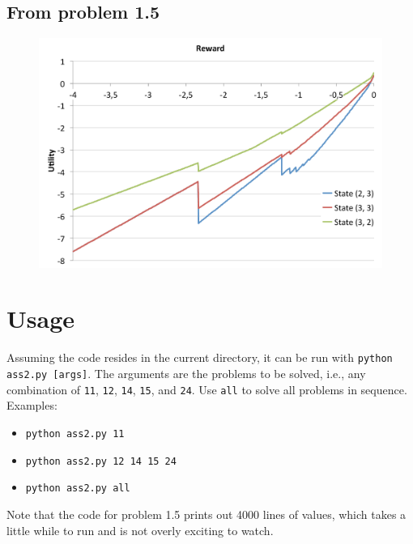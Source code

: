 \documentclass[letterpaper, 10pt]{article}
\begin{document}
\clearpage

\subsection{From problem 1.5}
\label{ssec:prob15fig}
\vfill
\begin{figure}[h]
	\centering
	\includegraphics[width=\textwidth]{prob15}
	\caption{}
	\label{fig:prob15}
\end{figure}
\vfill

\clearpage
\section{Usage}
Assuming the code resides in the current directory, it can be run with \texttt{python ass2.py [args]}. 
The arguments are the problems to be solved, i.e., any combination of \texttt{11}, \texttt{12}, \texttt{14}, \texttt{15}, and \texttt{24}. Use \texttt{all} to solve all problems in sequence. 
Examples:
\begin{itemize}
\item \texttt{python ass2.py 11}
\item \texttt{python ass2.py 12 14 15 24}
\item \texttt{python ass2.py all}
\end{itemize}
Note that the code for problem 1.5 prints out 4000 lines of values, which takes a little while to run and is not overly exciting to watch. 
\end{document}

